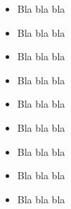 \documentclass{article}
\begin{document}
\begin{itemize}
	\item Bla bla bla
	\item Bla bla bla
	\item Bla bla bla
\end{itemize}

\LARGE

\begin{itemize}
	\item Bla bla bla
	\item Bla bla bla
	\item Bla bla bla
\end{itemize}

\footnotesize

\begin{itemize}
	\item Bla bla bla
	\item Bla bla bla
	\item Bla bla bla
\end{itemize}
\end{document}
